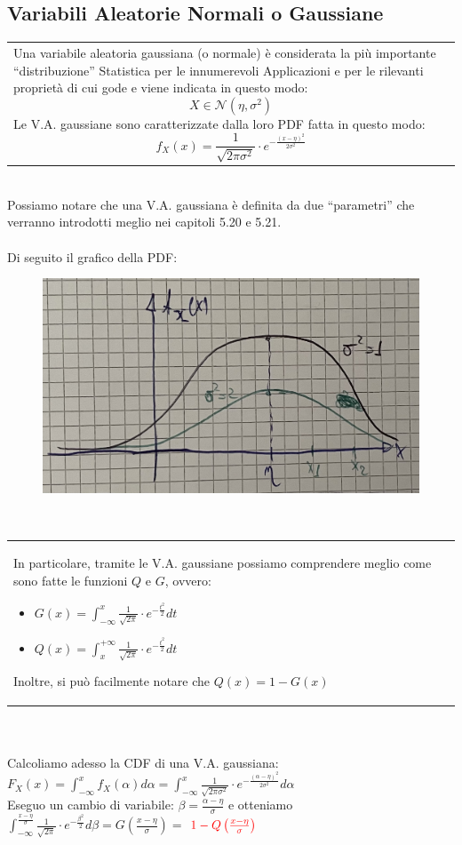 \documentclass{article}
\begin{document}
\subsection{Variabili Aleatorie Normali o Gaussiane}
\begin{tabular}{|p{13cm}}
Una variabile aleatoria gaussiana (o normale) è considerata la più importante “distribuzione” Statistica per le innumerevoli Applicazioni e per le rilevanti proprietà di cui gode e viene indicata in questo modo:
\[X \in \mathcal{N}\left( \eta, \sigma^2 \right)\]
Le V.A. gaussiane sono caratterizzate dalla loro PDF fatta in questo modo:
\[f_X(x) = \frac{1}{\sqrt{2 \pi \sigma ^2}} \cdot e^{- \frac{(x-\eta)^2}{2 \sigma^2}}\]
\end{tabular} \\
Possiamo notare che una V.A. gaussiana è definita da due “parametri” che verranno introdotti meglio nei capitoli 5.20 e 5.21. \\ \\
Di seguito il grafico della PDF:
\begin{figure}[ht]
\centering
\includegraphics[scale=0.12]{images/37.PDF_VA_gauss.jpeg}
\end{figure} ~\\
\begin{tabular}{|p{13cm}}
In particolare, tramite le V.A. gaussiane possiamo comprendere meglio come sono fatte le funzioni $Q$ e $G$, ovvero:
\begin{itemize}
    \item $G(x) = \int_{- \infty}^{x} \frac{1}{\sqrt{2 \pi}} \cdot e^{- \frac{t^2}{2}} dt$
    \item $Q(x) = \int_{x}^{+ \infty} \frac{1}{\sqrt{2 \pi}} \cdot e^{- \frac{t^2}{2}} dt$
\end{itemize}
Inoltre, si può facilmente notare che $Q(x) = 1 -G(x)$
\end{tabular} \\ \\
Calcoliamo adesso la CDF di una V.A. gaussiana: \\
$F_X(x) = \int_{- \infty}^{x} f_X(\alpha) d\alpha = \int_{- \infty}^{x} \frac{1}{\sqrt{2 \pi \sigma^2}} \cdot e^{- \frac{(\alpha - \eta)^2}{2 \sigma^2}} d\alpha$ \\
Eseguo un cambio di variabile: $\beta = \frac{\alpha - \eta}{\sigma}$ e otteniamo \\
$\int_{- \infty}^{\frac{x-\eta}{\sigma}} \frac{1}{\sqrt{2 \pi }} \cdot e^{- \frac{\beta^2}{2 }} d\beta = G\left(\frac{x - \eta}{\sigma}\right) =$ $\color{red}1 - Q\left( \frac{x - \eta}{\sigma} \right)$
\end{document}
